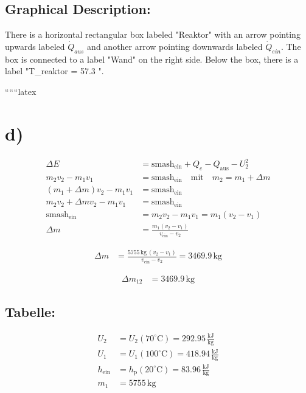 \subsection*{Graphical Description:}

There is a horizontal rectangular box labeled "Reaktor" with an arrow pointing upwards labeled $\dot{Q}_{aus}$ and another arrow pointing downwards labeled $\dot{Q}_{ein}$. The box is connected to a label "Wand" on the right side. Below the box, there is a label "T_{reaktor} = 57.3 ".

``````latex

\section*{d)}
\begin{align*}
\Delta E &= \text{smash}_{\text{ein}} + Q_e - Q_{\text{aus}} - U_2^2 \\
m_2 v_2 - m_1 v_1 &= \text{smash}_{\text{ein}} \quad \text{mit} \quad m_2 = m_1 + \Delta m \\
(m_1 + \Delta m) v_2 - m_1 v_1 &= \text{smash}_{\text{ein}} \\
m_2 v_2 + \Delta m v_2 - m_1 v_1 &= \text{smash}_{\text{ein}} \\
\text{smash}_{\text{ein}} &= m_2 v_2 - m_1 v_1 = m_1 (v_2 - v_1) \\
\Delta m &= \frac{m_1 (v_2 - v_1)}{v_{\text{ein}} - v_2}
\end{align*}

\begin{align*}
\Delta m &= \frac{5755 \, \text{kg} \, (v_2 - v_1)}{v_{\text{ein}} - v_2} = 3469.9 \, \text{kg}
\end{align*}

\begin{align*}
\Delta m_{12} &= 3469.9 \, \text{kg}
\end{align*}

\subsection*{Tabelle:}
\begin{align*}
U_2 &= U_2 (70^\circ \text{C}) = 292.95 \, \frac{\text{kJ}}{\text{kg}} \\
U_1 &= U_1 (100^\circ \text{C}) = 418.94 \, \frac{\text{kJ}}{\text{kg}} \\
h_{\text{ein}} &= h_{\text{p}} (20^\circ \text{C}) = 83.96 \, \frac{\text{kJ}}{\text{kg}} \\
m_1 &= 5755 \, \text{kg}
\end{align*}

